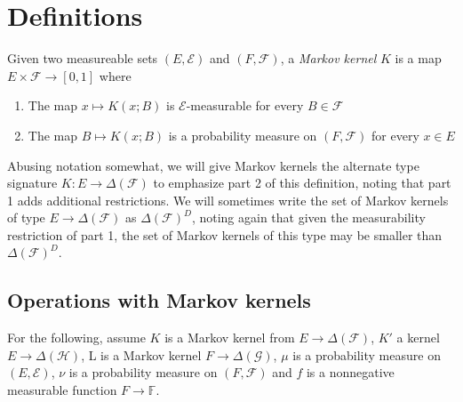 \section{Definitions}




Given two measureable sets $(E,\mathcal{E})$ and $(F,\mathcal{F})$, a \emph{Markov kernel} $K$ is a map $E\times \mathcal{F} \to [0,1]$ where
\begin{enumerate}
    \item The map $x\mapsto K(x;B)$ is $\mathcal{E}$-measurable for every $B\in\mathcal{F}$
    \item The map $B\mapsto K(x;B)$ is a probability measure on $(F,\mathcal{F})$ for every $x\in E$
\end{enumerate}

Abusing notation somewhat, we will give Markov kernels the alternate type signature $K:E\to \Delta(\mathcal{F})$ to emphasize part 2 of this definition, noting that part 1 adds additional restrictions. We will sometimes write the set of Markov kernels of type $E\to \Delta(\mathcal{F})$ as $\Delta(\mathcal{F})^D$, noting again that given the measurability restriction of part 1, the set of Markov kernels of this type may be smaller than $\Delta(\mathcal{F})^D$.



\subsection{Operations with Markov kernels}

For the following, assume $K$ is a Markov kernel from $E\to \Delta(\mathcal{F})$, $K'$ a kernel $E\to \Delta(\mathcal{H})$, L is a Markov kernel $F\to \Delta(\mathcal{G})$, $\mu$ is a probability measure on $(E,\mathcal{E})$, $\nu$ is a probability measure on $(F,\mathcal{F})$ and $f$ is a nonnegative measurable function $F\to \mathbb{F}$.


